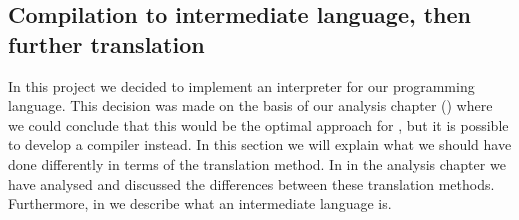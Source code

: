 \subsection{Compilation to intermediate language, then further translation}
\label{sec:compiletointermediate}

In this project we decided to implement an interpreter for our programming
language. This decision was made on the basis of our analysis chapter
() where we could conclude that this would be the optimal
approach for \productname{}, but it is possible to develop a compiler instead. In
this section we will explain what we should have done differently in terms of
the translation method. In  in the
analysis chapter we have analysed and discussed the differences between these
translation methods. Furthermore, in  we
describe what an intermediate language is.


%
%
%

